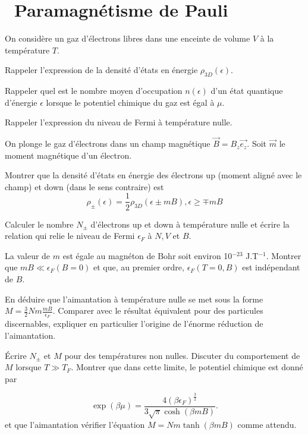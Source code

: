 \documentclass[utf8, 11pt]{feuille}
\begin{document}




\section{\medium~Paramagnétisme de Pauli}

On considère un gaz d'électrons libres dans une enceinte de volume $V$ à la température $T$.

\question
Rappeler l'expression de la densité d'états en énergie $\rho_{3D}(\epsilon)$.

\question
Rappeler quel est le nombre moyen d'occupation $n(\epsilon)$ d'un état quantique d'énergie $\epsilon$ lorsque le potentiel chimique du gaz est égal à $\mu$.

\question
Rappeler l'expression du niveau de Fermi à température nulle.

\medskip

On plonge le gaz d'électrons dans un champ magnétique $\vec{B}=B_z\vec{e_z}$. Soit $\vec{m}$ le moment magnétique d'un électron.

\question
Montrer que la densité d'états en énergie des électrons up (moment aligné avec le champ) et down (dans le sens contraire) est
$$
\rho_\pm(\epsilon)=\frac{1}{2}\rho_{3D}(\epsilon \pm mB), \epsilon \geq \mp mB
$$

\question
Calculer le nombre $N_\pm$ d'électrons up et down à température nulle et écrire la relation qui relie le niveau de Fermi $\epsilon_F$ à $N, V$ et $B$.

\question
La valeur de $m$ est égale au  magnéton de Bohr soit environ 10$^{-23}$ J.T$^{-1}$. Montrer que $mB \ll \epsilon_F(B=0)$ et que, au premier ordre, $\epsilon_F(T=0,B)$ est indépendant de $B$.

\question
En déduire que l'aimantation à température nulle se met sous la forme $M=\frac{3}{2} N m \frac{mB}{\epsilon_F}$. Comparer avec le résultat équivalent pour des particules discernables, expliquer en particulier l'origine de l'énorme réduction de l'aimantation.

\question
\'Ecrire $N_\pm$ et $M$ pour des températures non nulles. Discuter du comportement de $M$ lorsque $T\gg T_F$. Montrer que dans cette limite, le potentiel chimique est donné par

$$
\exp (\beta \mu)=\frac{4(\beta \epsilon_F)^{\frac{3}{2}}}{3\sqrt{\pi}\cosh(\beta m B)}. \nonumber
$$
et que l'aimantation vérifier l'équation $M= Nm\tanh(\beta m B)$ comme attendu.
\end{document}
